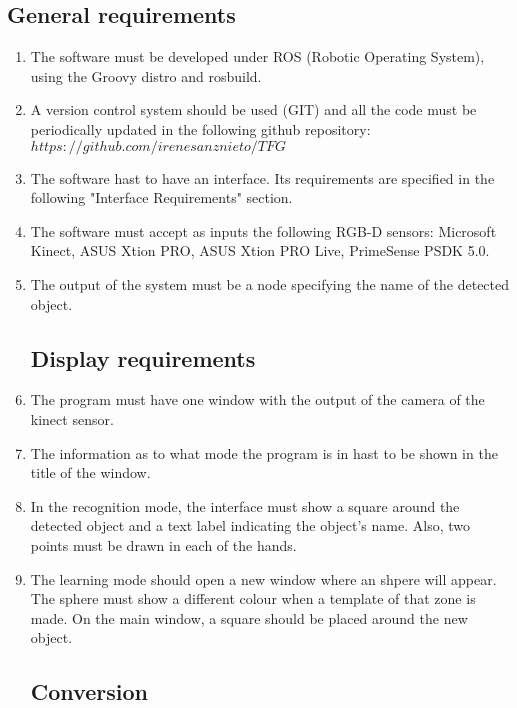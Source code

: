\documentclass{article}
\makeatletter
\def\threedigits#1{\expandafter\@threedigits\csname c@#1\endcsname}
\def\@threedigits#1{%
  \ifnum#1<100 0\fi
  \ifnum#1<10 0\fi
  \number#1}
\makeatother
\begin{document}
\subsection{General requirements}
\begin{enumerate}[label=\textbf{FR\threedigits*}]

	\item The software must be developed under ROS (Robotic Operating System), using the Groovy distro and rosbuild.
	\item A version control system should be used (GIT) and all the code must be periodically updated in the following github repository:  $https://github.com/irenesanznieto/TFG$
	\item The software hast to have an interface. Its requirements are specified in the following "Interface Requirements" section. 
	\item The software must accept as inputs the following RGB-D sensors: Microsoft Kinect, ASUS Xtion PRO, ASUS Xtion PRO Live, PrimeSense PSDK 5.0.
	\item The output of the system must be a node specifying the name of the detected object. 
 

 
\subsection{Display requirements}

\item The program must have one window with the output of the camera of the kinect sensor. 
\item The information as to what mode the program is in hast to be shown in the title of the window.
\item In the recognition mode, the interface must show a square around the detected object and a text label indicating the object's name. Also, two points must be drawn in each of the hands. 
\item The learning mode should open a new window where an shpere will appear. The sphere must show a different colour when a template of that zone is made. On the main window, a square should be placed around the new object. 

\subsection{Conversion}


\end{enumerate}
\end{document}
